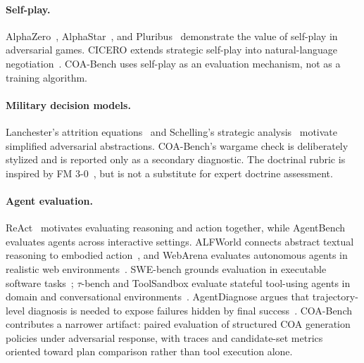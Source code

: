 \documentclass[letterpaper]{article}
\begin{document}
\paragraph{Self-play.}
AlphaZero~\citep{silver2018alphazero}, AlphaStar~\citep{vinyals2019alphastar}, and Pluribus~\citep{brown2019superhuman} demonstrate the value of self-play in adversarial games. CICERO extends strategic self-play into natural-language negotiation~\citep{bakhtin2022cicero}. COA-Bench uses self-play as an evaluation mechanism, not as a training algorithm.

\paragraph{Military decision models.}
Lanchester's attrition equations~\citep{lanchester1916} and Schelling's strategic analysis~\citep{schelling1960} motivate simplified adversarial abstractions. COA-Bench's wargame check is deliberately stylized and is reported only as a secondary diagnostic. The doctrinal rubric is inspired by FM 3-0~\citep{fm30}, but is not a substitute for expert doctrine assessment.

\paragraph{Agent evaluation.}
ReAct~\citep{yao2023react} motivates evaluating reasoning and action together, while AgentBench~\citep{liu2024agentbench} evaluates agents across interactive settings. ALFWorld connects abstract textual reasoning to embodied action~\citep{shridhar2021alfworld}, and WebArena evaluates autonomous agents in realistic web environments~\citep{zhou2024webarena}. SWE-bench grounds evaluation in executable software tasks~\citep{jimenez2024swebench}; $\tau$-bench and ToolSandbox evaluate stateful tool-using agents in domain and conversational environments~\citep{yao2024taubench,lu2025toolsandbox}. AgentDiagnose argues that trajectory-level diagnosis is needed to expose failures hidden by final success~\citep{ou2025agentdiagnose}. COA-Bench contributes a narrower artifact: paired evaluation of structured COA generation policies under adversarial response, with traces and candidate-set metrics oriented toward plan comparison rather than tool execution alone.
\end{document}
